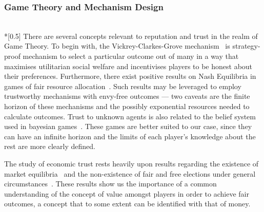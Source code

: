 \subsubsection{Game Theory and Mechanism Design} \ \\*[0.5\baselineskip]
  There are several concepts relevant to reputation and trust in the realm of Game Theory.
  To begin with, the Vickrey-Clarkes-Grove mechanism~\cite{nisan2007algorithmic} is
  strategy-proof mechanism to select a particular outcome out of many in a way that
  maximises utilitarian social welfare and incentivises players to be honest about their
  preferences. Furthermore, there exist positive results on Nash Equilibria in games of
  fair resource allocation~\cite{cakecutting}. Such results may be leveraged to employ
  trustworthy mechanisms with envy-free outcomes --- two caveats are the finite horizon
  of these mechanisms and the possibly exponential resources needed to calculate outcomes.
  Trust to unknown agents is also related to the belief system used in bayesian
  games~\cite{bayesiangames}. These games are better suited to our case, since they can
  have an infinite horizon and the limits of each player's knowledge about the rest are
  more clearly defined.

  The study of economic trust rests heavily upon results regarding the existence of market
  equilibria~\cite{marketequilibrium} and the non-existence of fair and free elections
  under general circumstances~\cite{arrowtheorem}. These results show us the importance of
  a common understanding of the concept of value amongst players in order to achieve fair
  outcomes, a concept that to some extent can be identified with that of money.
